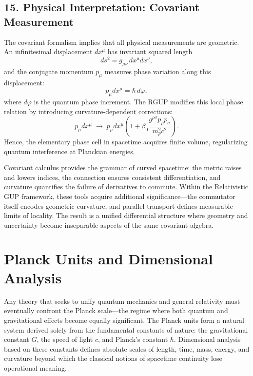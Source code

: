 \documentclass[11pt,oneside]{book}
\newenvironment{booknote}{
  \begin{tcolorbox}[
    colback=gray!3!white,
    colframe=gray!45!black,
    fonttitle=\bfseries,
    title=\textbf{Book Note},
  ]
}{\end{tcolorbox}}
\numberwithin{equation}{chapter}
\newcommand{\betaz}{\beta_0}
\begin{document}
\subsection*{15. Physical Interpretation: Covariant Measurement}

The covariant formalism implies that all physical measurements are geometric.  
An infinitesimal displacement $dx^\mu$ has invariant squared length
\begin{equation}
ds^2 = g_{\mu\nu}\,dx^\mu dx^\nu,
\end{equation}
and the conjugate momentum $p_\mu$ measures phase variation along this displacement:
\begin{equation}
p_\mu dx^\mu = \hbar\,d\varphi,
\end{equation}
where $d\varphi$ is the quantum phase increment.  
The RGUP modifies this local phase relation by introducing curvature-dependent corrections:
\begin{equation}
p_\mu dx^\mu
\;\rightarrow\;
p_\mu dx^\mu
\left(1+\betaz\frac{g^{\rho\sigma}p_\rho p_\sigma}{m_p^2 c^2}\right).
\end{equation}
Hence, the elementary phase cell in spacetime acquires finite volume, regularizing quantum interference at Planckian energies. \vspace{0.8em}

\begin{booknote}
Covariant calculus provides the grammar of curved spacetime: the metric raises and lowers indices, the connection ensures consistent differentiation, and curvature quantifies the failure of derivatives to commute.  Within the Relativistic GUP framework, these tools acquire additional significance—the commutator itself encodes geometric curvature, and parallel transport defines measurable limits of locality.  The result is a unified differential structure where geometry and uncertainty become inseparable aspects of the same covariant algebra.
\end{booknote}
\clearpage
\section{Planck Units and Dimensional Analysis}

Any theory that seeks to unify quantum mechanics and general relativity must eventually confront the Planck scale—the regime where both quantum and gravitational effects become equally significant.  
The Planck units form a natural system derived solely from the fundamental constants of nature: the gravitational constant $G$, the speed of light $c$, and Planck’s constant $\hbar$.  
Dimensional analysis based on these constants defines absolute scales of length, time, mass, energy, and curvature beyond which the classical notions of spacetime continuity lose operational meaning.
\end{document}
